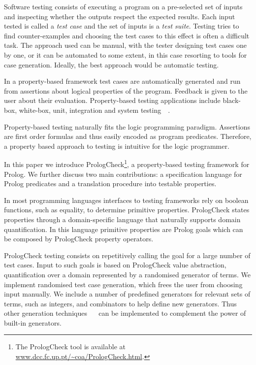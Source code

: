 \documentclass[runningheads,a4paper]{../../PaperStyles/llncs}
\newcommand{\Prolog}[0]{{\sf Prolog}}
\newcommand{\plqc}[0]{{\sf PrologCheck}}
\begin{document}
Software testing consists of executing a program on
a pre-selected set of inputs and inspecting whether the outputs
respect the expected results.
%
Each input tested is called a \emph{test case} and the set of inputs is
a \emph{test suite}.
%
Testing tries to find counter-examples and choosing the test cases to
this effect is often a difficult task.
%
The approach used can be  manual, with the tester designing test cases
one by one, or it can be automated to some extent, in this case
resorting to tools for case generation.
%
Ideally, the best approach would be automatic testing.



In a property-based framework test cases are automatically generated and run
from assertions about logical properties of the program.
%
Feedback is given to the user about their evaluation.
%
Property-based testing applications include black-box, white-box, unit,
integration and system
testing~\cite{Boberg-model-based-testing-erl}~\cite{Claessen-ranking-prog-blackbox,Claessen-find-race-cond-erl}.




Property-based testing naturally fits the logic programming paradigm. 
%
Assertions are first order formulas and thus easily encoded as program predicates.
%
Therefore, a property based approach to testing
is intuitive for the
logic programmer.



In this paper we introduce \plqc{}\footnote{The \plqc{} tool is available at \url{www.dcc.fc.up.pt/~coa/PrologCheck.html}.},
a property-based testing framework for \Prolog{}.
%
We further discuss two main contributions: a specification language for \Prolog{} predicates
and a translation procedure into testable properties.



In most programming languages interfaces to testing frameworks rely
on boolean functions, such as equality, to determine primitive properties.
%
\plqc{} states properties through a domain-specific language that
naturally supports domain quantification.
%
In this language primitive properties are \Prolog{} goals which can be
composed by \plqc{} property operators. 



\plqc{} testing consists on repetitively calling the goal for a large number of
test cases.
%
Input to such goals is based on \plqc{} value abstraction,
quantification over a domain represented by a randomised generator of
terms.
%
We implement randomised test case generation, which frees the user
from choosing input manually.
%
We include a number of predefined generators for relevant sets of
terms, such as integers, and combinators to help define new
generators.
%
Thus other generation techniques
\cite{Duregard-2012-feat}~\cite{naylor2007logic}~\cite{runciman2008smallcheck} can be
implemented  to complement the power of built-in generators.
\end{document}
